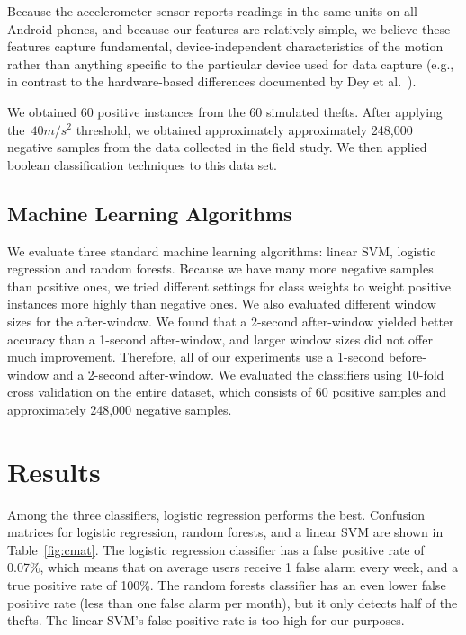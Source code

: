Because the accelerometer sensor reports readings in the same units on all Android phones, and because our features are relatively simple, we believe these features capture fundamental, device-independent characteristics of the motion rather than anything specific to the particular device used for data capture (e.g., in contrast to the hardware-based differences documented by Dey et al.~\cite{Dey2014}).

We obtained 60 positive instances from the 60 simulated thefts.
After applying the~$40 m/s^2$ threshold, we obtained approximately approximately 248,000 negative samples from the data collected in the field study. 
We then applied boolean classification techniques to this data set.





\subsection{Machine Learning Algorithms}
We evaluate three standard machine learning algorithms: linear SVM, logistic regression and random forests.
Because we have many more negative samples than positive ones, we tried different settings for class weights to weight positive instances more highly than negative ones.
We also evaluated different window sizes for the after-window.
We found that a 2-second after-window yielded better accuracy than a 1-second after-window, and larger window sizes did not offer much improvement.
Therefore, all of our experiments use a 1-second before-window and a 2-second after-window.
We evaluated the classifiers using 10-fold cross validation on the entire dataset, which consists of 60 positive samples and approximately 248,000 negative samples. 



\section{Results}
Among the three classifiers, logistic regression performs the best.
Confusion matrices for logistic regression, random forests, and a linear SVM
are shown in Table~\ref{fig:cmat}.
The logistic regression classifier has a false positive rate of 0.07\%, which means that on average users receive 1 false alarm every week, and a true positive rate of 100\%.
The random forests classifier has an even lower false positive rate (less than one false alarm per month),
but it only detects half of the thefts.
The linear SVM's false positive rate is too high for our purposes.


